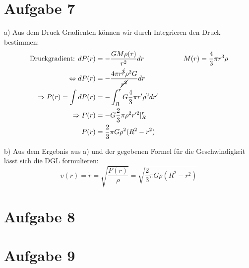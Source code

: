 \documentclass[11pt a4paper]{article}
\begin{document}
\thispagestyle{fancy}
\section*{Aufgabe 7}
\par{a)}
Aus dem Druck Gradienten können wir durch Integrieren den Druck bestimmen:
\begin{align*}
	\text{Druckgradient: }
	dP(r) &= -\frac{GM \rho(r)}{r^2} dr \hspace{2cm}
	M(r) = \frac43 \pi r^3 \rho \\
	\Leftrightarrow
	dP(r) &= -\frac{4 \pi r^{\cancel{3}} \rho^2 G}{\cancel{r^2}} dr \\
	\Rightarrow
	P(r) = \int dP(r)
	&= - \int_R^r G \frac43 \pi r^\prime \rho^2 dr^\prime \\
	\Rightarrow
	P(r) &= - G \frac23 \pi \rho^2 r^{\prime 2} \vert_R^r \\
	P(r) &= \frac23 \pi G \rho^2 (R^2 - r^2)
\end{align*}
\vspace{0.5cm}
\par{b)}
Aus dem Ergebnis aus a) und der gegebenen Formel für die Geschwindigkeit 
lässt sich die DGL formulieren:
\[
	v(r) = \dot{r} = \sqrt{\frac{P(r)}{\rho}} = 
	\sqrt{\frac23 \pi G \rho (R^2 - r^2)}
	\]

\section*{Aufgabe 8}
\section*{Aufgabe 9}
\end{document}

